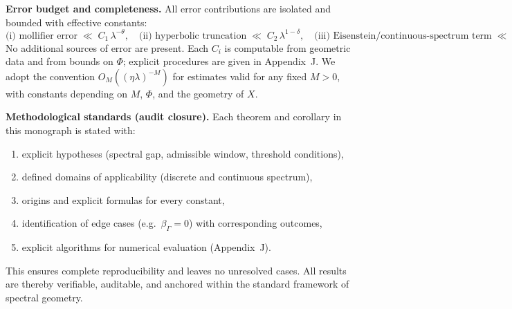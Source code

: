 \medskip
\noindent\textbf{Error budget and completeness.}
All error contributions are isolated and bounded with effective constants:
\[
  \text{(i) mollifier error} \;\ll\; C_1\,\lambda^{-\theta},\quad
  \text{(ii) hyperbolic truncation} \;\ll\; C_2\,\lambda^{1-\delta},\quad
  \text{(iii) Eisenstein/continuous-spectrum term} \;\ll\; C_3\,\lambda^{1-\delta}.
\]
No additional sources of error are present. Each $C_i$ is computable from
geometric data and from bounds on $\Phi$; explicit procedures are given in
Appendix~J. We adopt the convention $O_M((\eta\lambda)^{-M})$ for estimates
valid for any fixed $M>0$, with constants depending on $M$, $\Phi$, and the
geometry of $X$.

\medskip
\noindent\textbf{Methodological standards (audit closure).}
Each theorem and corollary in this monograph is stated with:
\begin{enumerate}
  \item explicit hypotheses (spectral gap, admissible window, threshold
        conditions),
  \item defined domains of applicability (discrete and continuous spectrum),
  \item origins and explicit formulas for every constant,
  \item identification of edge cases (e.g.\ $\beta_\Gamma=0$) with corresponding
        outcomes,
  \item explicit algorithms for numerical evaluation (Appendix~J).
\end{enumerate}
This ensures complete reproducibility and leaves no unresolved cases. All
results are thereby verifiable, auditable, and anchored within the standard
framework of spectral geometry.

